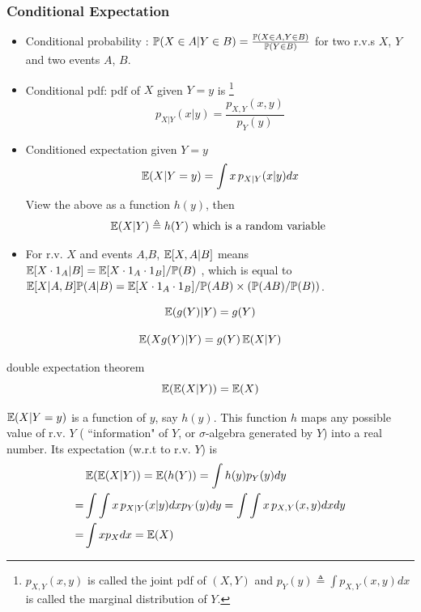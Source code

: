 \documentclass[english,10pt,handout]{beamer}
\begin{document}
\begin{frame}
\frametitle{ Conditional Expectation}

\begin{itemize}
\item Conditional probability  : $\mathbb{P}(X\in A|Y \in B) = \frac{\mathbb{P}(X\in A, Y\in B)} {\mathbb{P}(Y\in B)}$ for two  r.v.s $X$, $Y$ and two events $A$, $B$.
\item Conditional pdf: 
pdf of $X$ given $Y=y$ is 
\footnote{ $p_{X,Y}(x,y)$ is called  the joint pdf of $(X,Y)$ and
$p_Y(y)\triangleq \int p_{X,Y}(x,y)dx$ is called  the marginal distribution of $Y$. }
\[ p_{X|Y}(x|y)= \frac{p_{X,Y}(x,y)}{p_Y(y)}\]

\item Conditioned expectation given $Y=y$
\[ \operatorname{\mathbb E}(X|Y=y) = \int x\, p_{X|Y}(x|y) dx \]
View the above as a function $h(y)$, then 
\[\operatorname{\mathbb E}(X|Y) \triangleq  h(Y) \mbox{ which is a random variable }\]

\item For r.v. $X$ and events $A$,$B$, $\operatorname{\mathbb E}[X, A|B] $ means $\operatorname{\mathbb E}[X\cdot1_A|B]=\operatorname{\mathbb E} [ X \cdot 1_A \cdot 1_B ]/\mathbb{P}(B)$
, which is equal to
$\operatorname{\mathbb E}[X|A, B] \mathbb{P}(A|B)=\operatorname{\mathbb E}[ X \cdot 1_A \cdot 1_B ]/\mathbb{P}(AB)  \times ( \mathbb{P}(AB)/\mathbb{P}(B) )$.



   

\end{itemize}
\end{frame}


\begin{frame}
\begin{theorem}
\[
\operatorname{\mathbb E}(g(Y)|Y)=g(Y)\]

\[\operatorname{\mathbb E} (X g(Y) | Y)=
g(Y) \operatorname{\mathbb E}(X|Y)\]

\end{theorem}

\bigskip
 \begin{block}{double expectation theorem}
  \[\operatorname{\mathbb E}(\operatorname{\mathbb E}(X|Y))=\operatorname{\mathbb E}(X)\]
\end{block}
$\operatorname{\mathbb E}(X|Y=y)$ is a function of $y$, say $h(y)$. 
This function $h$ maps any possible value of r.v. $Y$ ( ``information" of $Y$, or
$\sigma$-algebra generated by $Y$)
 into a real number. 
Its expectation (w.r.t to r.v. $Y$) is
\[
\begin{split}
&\operatorname{\mathbb E}(\operatorname{\mathbb E}(X|Y))=\operatorname{\mathbb E}( h(Y)) = \int  h(y)p_Y(y)dy
\\
= & 
\int 
\int x\, p_{X|Y}(x|y) dxp_Y(y)dy=
\int 
\int x\, p_{X,Y}(x, y) dxdy\\  
  =&\int x  p_{X} dx=
  \operatorname{\mathbb E}(X ) 
\\
  \end{split}
  \]
 


\end{frame}
\end{document}
